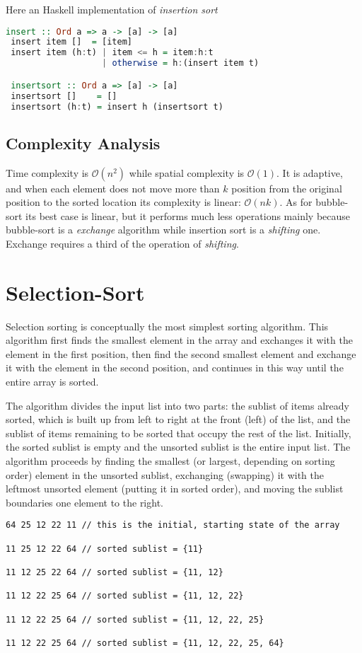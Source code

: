 Here an Haskell implementation of \textit{insertion sort}
\begin{lstlisting}[language=Haskell,caption="Haskell Insertion sort "]
 insert :: Ord a => a -> [a] -> [a]
 insert item []  = [item]
 insert item (h:t) | item <= h = item:h:t
                   | otherwise = h:(insert item t)

 insertsort :: Ord a => [a] -> [a]
 insertsort []    = []   
 insertsort (h:t) = insert h (insertsort t)
\end{lstlisting}

\subsection{Complexity Analysis}
Time complexity is  $\mathcal{O}(n^2)$ while spatial complexity is  $\mathcal{O}(1)$. It is adaptive, and when each element does not move more than $k$ position from the original position to the sorted location its complexity is linear:  $\mathcal{O}(nk)$.   As for bubble-sort its best case is linear, but it performs much less operations mainly because bubble-sort is a \textit{exchange} algorithm while insertion sort is a \textit{shifting} one. Exchange requires a third of the operation of \textit{shifting}.

\section{Selection-Sort}
Selection sorting is conceptually the most simplest sorting algorithm. This algorithm first finds the smallest element in the array and exchanges it with the element in the first position, then find the second smallest element and exchange it with the element in the second position, and continues in this way until the entire array is sorted. 

The algorithm divides the input list into two parts: the sublist of items already sorted, which is built up from left to right at the front (left) of the list, and the sublist of items remaining to be sorted that occupy the rest of the list. Initially, the sorted sublist is empty and the unsorted sublist is the entire input list. The algorithm proceeds by finding the smallest (or largest, depending on sorting order) element in the unsorted sublist, exchanging (swapping) it with the leftmost unsorted element (putting it in sorted order), and moving the sublist boundaries one element to the right.

\begin{verbatim}
64 25 12 22 11 // this is the initial, starting state of the array

11 25 12 22 64 // sorted sublist = {11}

11 12 25 22 64 // sorted sublist = {11, 12}

11 12 22 25 64 // sorted sublist = {11, 12, 22}

11 12 22 25 64 // sorted sublist = {11, 12, 22, 25}

11 12 22 25 64 // sorted sublist = {11, 12, 22, 25, 64}
\end{verbatim}
